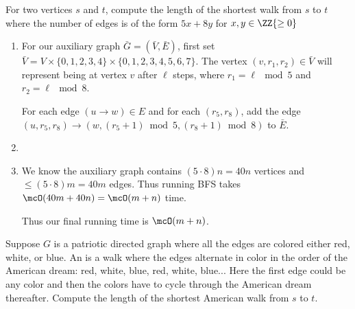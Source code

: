 \documentclass{article}
\begin{document}
\begin{subexercise} %
  For two vertices $s$ and $t$, compute the length of the shortest walk from $s$ to $t$ where the number of edges is of the form $ 5x+8y $ for $ x,y\in \ZZ{\geq 0} $
\end{subexercise}

\begin{solution}

\begin{enumerate}[label=(\alph*)]
  \item For our auxiliary graph $ \bar G=(\bar V,\bar E) $, first set $\bar V =V\times\{0,1,2,3,4\}\times\{0,1,2,3,4,5,6,7\}$.
  The vertex $(v,r_1,r_2)\in\bar V$ will represent being at vertex $ v $ after $ \ell $ steps, where $ r_1=\ell\mod 5 $ and $ r_2=\ell\mod 8 $.

	For each edge $(u \to w)\in E$ and for each $(r_5,r_8)$, add the edge $ (u, r_5, r_8)\to(w, (r_5+1)\bmod 5, (r_8+1)\bmod 8) $ to $ \bar E $.
  \item {}

  \item We know the auxiliary graph contains $ (5\cdot 8) n = 40n $ vertices and $ \leq (5\cdot 8) m = 40m $ edges. Thus running BFS takes $ \mcO(40m+40n) = \mcO(m+n) $ time.

  Thus our final running time is $ \mcO(m+n) $.
\end{enumerate}
\end{solution}
\pagebreak

\begin{subexercise} %
  Suppose $ G $ is a patriotic directed graph where all the edges are colored either red, white, or blue.
  An  is a walk where the edges alternate in color in the order of the American dream: red, white, blue, red, white, blue...
  Here the first edge could be any color and then the colors have to cycle through the American dream thereafter.
  Compute the length of the shortest American walk from $ s $ to $ t $.
\end{subexercise}
\end{document}
